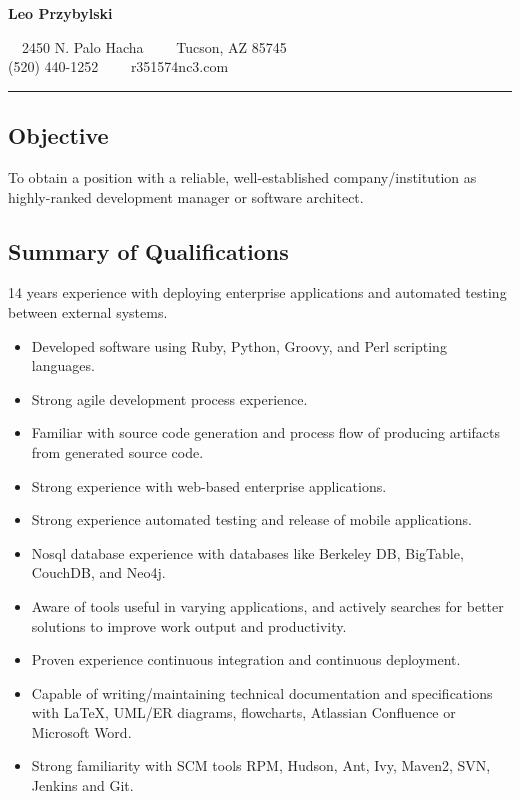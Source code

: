 \documentclass[10pt,letterpaper]{article}
\begin{document}
\begin{center}
{\LARGE \textbf{Leo Przybylski}}

\ \ 2450 N. Palo Hacha\ \ \textbullet
\ \ Tucson, AZ 85745
\\
(520) 440-1252\ \ \textbullet
\ \ r351574nc3\@gmail.com
\end{center}

\hrule
\vspace{-0.4em}
\subsection*{Objective}
To obtain a position with a reliable, well-established
company/institution as highly-ranked development manager or software
architect.

\subsection*{Summary of Qualifications}
14 years experience with deploying enterprise applications and
automated testing between external systems. 
\begin{itemize}
\item Developed software using Ruby, Python, Groovy, and Perl scripting languages.
\item Strong agile development process experience.
\item Familiar with source code generation and process flow of
  producing artifacts from generated source code.
\item Strong experience with web-based enterprise applications.
\item Strong experience automated testing and release of mobile applications.
\item Nosql database experience with databases like Berkeley DB,
  BigTable, CouchDB, and Neo4j.
\item Aware of tools useful in varying applications, and actively
  searches for better solutions to improve work output and productivity.
\item Proven experience continuous integration and continuous deployment.
\item Capable of writing/maintaining technical documentation and
  specifications with LaTeX, UML/ER diagrams, flowcharts, Atlassian Confluence or Microsoft Word.
\item Strong familiarity with SCM tools RPM, Hudson, Ant, Ivy, Maven2,
  SVN, Jenkins and Git.
\end{itemize}
\end{document}
